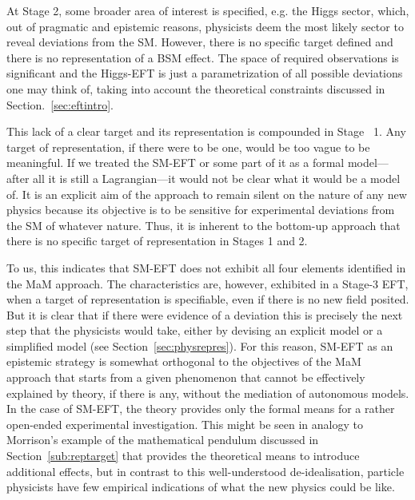 At Stage 2, some broader area of interest is specified, e.g. the Higgs sector, which, 
out of pragmatic and epistemic reasons, physicists deem the most likely sector to reveal deviations from the SM.
However, there is no specific target defined and there is no representation of a BSM effect.
The space of required observations is significant and the Higgs-EFT is just a parametrization of all possible deviations one may think of, taking into account the theoretical constraints discussed in Section.~\ref{sec:eftintro}. 

This lack of a clear target and its representation is compounded in Stage~ 1. Any target of representation, if there were to be one, would be too vague to be meaningful. 
If we treated the SM-EFT or some part of it as a formal model---after all it is still a Lagrangian---it would not be clear what it would be a model of.
It is an explicit aim of the approach to remain silent on the nature of any new physics because its objective is to be sensitive for experimental deviations from the SM of whatever nature. 
Thus, it is inherent to the bottom-up approach that there is no specific target of representation in Stages 1 and 2.

To us, this indicates that SM-EFT does not exhibit all four elements identified in the MaM approach. 
The characteristics are, however, exhibited in a Stage-3 EFT, when a target of representation is specifiable, even if there is no new field posited.  
But it is clear that if there were evidence of a deviation this is precisely the next step that the physicists would take, either by devising an explicit model or a simplified model (see Section~\ref{sec:physrepres}). 
For this reason, SM-EFT as an epistemic strategy is somewhat orthogonal to the objectives of the MaM approach that starts from a given phenomenon that cannot be effectively explained by theory, if there is any, without the mediation of autonomous models. In the case of SM-EFT, the theory provides only the formal means for a rather open-ended experimental investigation. 
This might be seen in analogy to Morrison's example of the mathematical pendulum discussed in Section~\ref{sub:reptarget} that provides the theoretical means to introduce additional effects, but in contrast to this well-understood de-idealisation, particle physicists have few empirical indications of what the new physics could be like.

